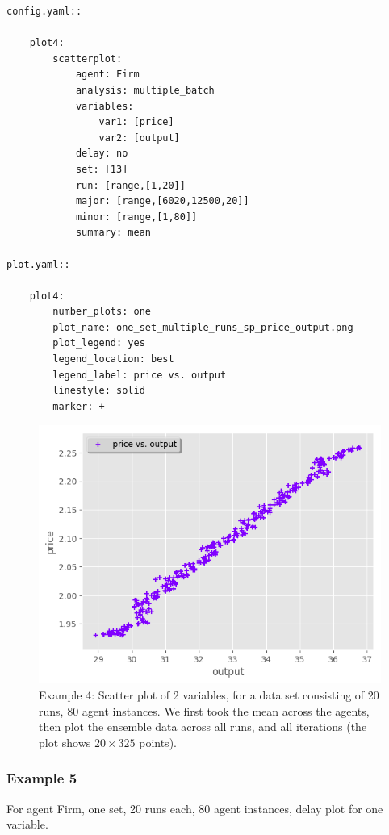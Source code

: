 \documentclass[10pt,a4paper]{article}
\begin{document}
\begin{lstlisting}
config.yaml::

    plot4:
        scatterplot:
            agent: Firm
            analysis: multiple_batch
            variables:
                var1: [price]
                var2: [output]
            delay: no    
            set: [13]
            run: [range,[1,20]]
            major: [range,[6020,12500,20]]
            minor: [range,[1,80]] 
            summary: mean

plot.yaml::

    plot4:
        number_plots: one
        plot_name: one_set_multiple_runs_sp_price_output.png
        plot_legend: yes
        legend_location: best
        legend_label: price vs. output
        linestyle: solid
        marker: +
\end{lstlisting}

\begin{figure}[b!]\centering\leavevmode
\includegraphics[scale=.7]{./plots_tut_2/one_set_multiple_runs_sp_price_output_0.png}
\caption{\footnotesize  Example 4: Scatter plot of 2 variables, for a data set consisting of 20 runs, 80 agent instances. We first took the mean across the agents, then plot the ensemble data across all runs, and all iterations (the plot shows $20\times 325$ points).}
\end{figure}

\clearpage
\subsubsection{Example 5}
 For agent Firm, one set, 20 runs each, 80 agent instances, delay plot for one variable.
\end{document}
